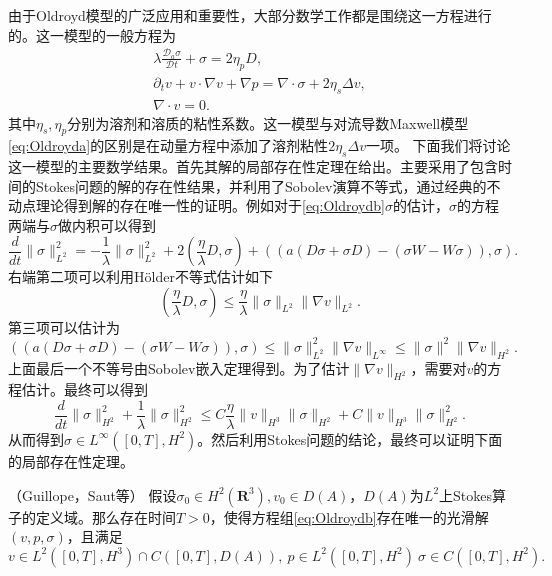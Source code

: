 由于Oldroyd模型的广泛应用和重要性，大部分数学工作都是围绕这一方程进行的。这一模型的一般方程为
\begin{subequations}\label{eq:Oldroydb}
\begin{align}
	\lambda \frac{\mathcal{D}_a \sigma}{\mathcal{D} t} + \sigma = 2 \eta_p D, \\
	\partial_t v + v \cdot \nabla v  + \nabla p = \nabla \cdot \sigma + 2 \eta_s \Delta v, \\
	\nabla \cdot v = 0.
\end{align}
\end{subequations}
其中$\eta_s,\eta_p$分别为溶剂和溶质的粘性系数。这一模型与对流导数Maxwell模型\eqref{eq:Oldroyda}的区别是在动量方程中添加了溶剂粘性$2\eta_s \Delta v$一项。
下面我们将讨论这一模型的主要数学结果。首先其解的局部存在性定理在\cite{guillope1990existence}给出。主要采用了包含时间的Stokes问题的解的存在性结果\cite{temam1995navier}，并利用了Sobolev演算不等式\cite{majda2012compressible}，通过经典的不动点理论得到解的存在唯一性的证明。例如对于\eqref{eq:Oldroydb}$\sigma$的估计，$\sigma$的方程两端与$\sigma$做内积可以得到
\begin{equation*}
	\frac{d}{dt} \|\sigma\|_{L^2}^2  =  -\frac{1}{\lambda} \|\sigma\|_{L^2}^2 + 2 (\frac{\eta}{\lambda} D, \sigma) + \left( (a(D \sigma + \sigma D) - (\sigma W -W \sigma)),\sigma \right).
\end{equation*}
右端第二项可以利用H\"older不等式估计如下
\begin{equation*}
	(\frac{\eta}{\lambda} D, \sigma) \le \frac{\eta}{\lambda} \|\sigma\|_{L^2} \|\nabla v\|_{L^2}.
\end{equation*}
第三项可以估计为
\begin{equation*}
	 \left( (a(D \sigma + \sigma D) - (\sigma W -W \sigma)),\sigma \right) \le \|\sigma\|_{L^2}^2 \|\nabla v\|_{L^\infty} \le \|\sigma\|^2 \|\nabla v\|_{H^2}
.
\end{equation*}
上面最后一个不等号由Sobolev嵌入定理得到。为了估计$\|\nabla v\|_{H^2}$，需要对$v$的方程估计。最终可以得到\cite{guillope1990existence}
\begin{equation*}
		\frac{d}{dt} \|\sigma\|_{H^2}^2 + \frac{1}{\lambda} \|\sigma\|_{H^2}^2 \le C \frac{\eta}{\lambda} \|v\|_{H^3} \|\sigma\|_{H^2} + C \|v\|_{H^3} \|\sigma\|_{H^2}^2.
\end{equation*}
从而得到$\sigma \in L^\infty([0,T],H^2)$。然后利用Stokes问题的结论，最终可以证明下面的局部存在性定理。
\begin{theorem}（Guillope，Saut等\cite{guillope1990existence,saut2012lectures}）
	假设$\sigma_0 \in H^2(\mathbf{R}^3),v_0 \in D(A)$，$D(A)$为$L^2$上Stokes算子的定义域。那么存在时间$T>0$，使得方程组\eqref{eq:Oldroydb}存在唯一的光滑解$(v,p,\sigma)$，且满足
	\begin{equation*}
		v \in L^2([0,T],H^3) \cap C([0,T],D(A)), \ p \in L^2([0,T],H^2) \ \sigma \in C([0,T],H^2).
	\end{equation*}
\end{theorem}
